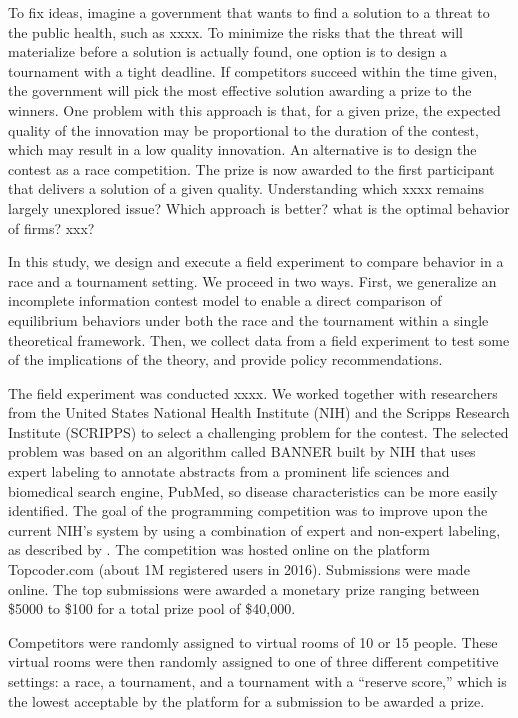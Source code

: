 \documentclass[12pt,]{article}
\begin{document}
To fix ideas, imagine a government that wants to find a solution to a
threat to the public health, such as xxxx. To minimize the risks that
the threat will materialize before a solution is actually found, one
option is to design a tournament with a tight deadline. If competitors
succeed within the time given, the government will pick the most
effective solution awarding a prize to the winners. One problem with
this approach is that, for a given prize, the expected quality of the
innovation may be proportional to the duration of the contest, which may
result in a low quality innovation. An alternative is to design the
contest as a race competition. The prize is now awarded to the first
participant that delivers a solution of a given quality. Understanding
which xxxx remains largely unexplored issue? Which approach is better?
what is the optimal behavior of firms? xxx?

In this study, we design and execute a field experiment to compare
behavior in a race and a tournament setting. We proceed in two ways.
First, we generalize an incomplete information contest model
\citep{moldovanu2001optimal} to enable a direct comparison of
equilibrium behaviors under both the race and the tournament within a
single theoretical framework. Then, we collect data from a field
experiment to test some of the implications of the theory, and provide
policy recommendations.

The field experiment was conducted xxxx. We worked together with
researchers from the United States National Health Institute (NIH) and
the Scripps Research Institute (SCRIPPS) to select a challenging problem
for the contest. The selected problem was based on an algorithm called
BANNER built by NIH \citep{leaman2008banner} that uses expert labeling
to annotate abstracts from a prominent life sciences and biomedical
search engine, PubMed, so disease characteristics can be more easily
identified. The goal of the programming competition was to improve upon
the current NIH's system by using a combination of expert and non-expert
labeling, as described by \citet{good2014microtask}. The competition was
hosted online on the platform Topcoder.com (about 1M registered users in
2016). Submissions were made online. The top submissions were awarded a
monetary prize ranging between \$5000 to \$100 for a total prize pool of
\$40,000.

Competitors were randomly assigned to virtual rooms of 10 or 15 people.
These virtual rooms were then randomly assigned to one of three
different competitive settings: a race, a tournament, and a tournament
with a ``reserve score,'' which is the lowest acceptable by the platform
for a submission to be awarded a prize.
\end{document}
